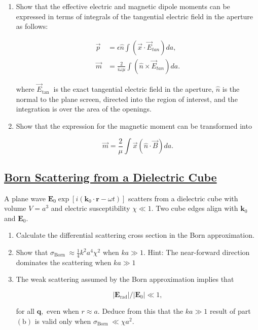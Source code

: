 \begin{enumerate}
	\item Show that the effective electric and magnetic dipole moments can be expressed in terms of integrals of the tangential electric field in the aperture as follows:

	\begin{subequations}
		\begin{align}
			\vec{p} &=\epsilon \hat{n} \int\left(\vec{x} \cdot \vec{E}_{t a n}\right) d a, \\
			\vec{m}&= \frac{2}{i \omega \mu} \int\left(\hat{n} \times \vec{E}_{t a n}\right) d a.
		\end{align}
	\end{subequations}

	where $\vec{E}_{\text {tan }}$ is the exact tangential electric field in the aperture, $\hat{n}$ is the normal to the plane screen, directed into the region of interest, and the integration is over the area of the openings.
	\item  Show that the expression for the magnetic moment can be transformed into
	
	\begin{equation}
		\vec{m}=\frac{2}{\mu} \int \vec{x}(\hat{n} \cdot \vec{B}) d a.
	\end{equation}
\end{enumerate}

\subsection{\hyperref[Born Scattering from a Dielectric Cube]{Born Scattering from a Dielectric Cube}} 

A plane wave $\mathbf{E}_{0} \exp \left[i\left(\mathbf{k}_{0} \cdot \mathbf{r}-\omega t\right)\right]$ scatters from a dielectric cube with volume $V=a^{3}$ and electric susceptibility $\chi \ll 1$. Two cube edges align with $\mathbf{k}_{0}$ and $\mathbf{E}_{0}$.

\begin{enumerate}
	\item Calculate the differential scattering cross section in the Born approximation.
	\item Show that $\sigma_{\text {Born }} \approx \frac{1}{4} k^{2} a^{4} \chi^{2}$ when $k a \gg 1$. Hint: The near-forward direction dominates the scattering when $k a \gg 1$
	\item The weak scattering assumed by the Born approximation implies that 
	
	\begin{equation}
		\left|\mathbf{E}_{\mathrm{rad}}\right| /\left|\mathbf{E}_{0}\right| \ll 1,
	\end{equation}

	 for all $\mathbf{q},$ even when $r \approx a .$ Deduce from this that the $k a \gg 1$ result of part $(\mathrm{b})$ is valid only when $\sigma_{\text {Born }} \ll \chi a^{2}$.
\end{enumerate}

